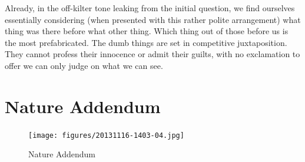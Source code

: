 \documentclass{book}
\begin{document}
Already, in the off-kilter tone leaking from the initial question, we find
ourselves essentially considering (when presented with this rather polite
arrangement) what thing was there before what other thing. Which thing out of
those before us is the most prefabricated. The dumb things are set in
competitive juxtaposition. They cannot profess their innocence or admit their
guilts, with no exclamation to offer we can only judge on what we can see.

\chapter{Nature Addendum}

\begin{figure}
\centering
\texttt{[image: figures/20131116-1403-04.jpg]}
\caption{Nature Addendum}
\end{figure}
\end{document}
